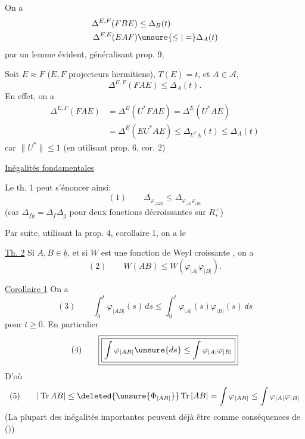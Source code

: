 

On a 
\[
\begin{aligned}
\Delta^{E,F}(FBE)&\leq\Delta_B(t)\\
\Delta^{F,E}(EAF)&\unsure{\leq|=}\Delta_A(t)
\end{aligned}
\]
par un lemme évident, généralisant prop. 9;

\margin{$\Big|$}
Soit $E\approx F$ ($E,F$ projecteurs hermitiens), $T(E)=t$, et $A\in\mathcal A$, 
\[
\Delta^{E,F}(FAE)\leq\Delta_A(t).
\]
En effet, on a
\[
\begin{aligned}
\Delta^{E,F}(FAE)&=\Delta^E(U^*FAE)=\Delta^E(U^*AE)\\
&=\Delta^E(EU^*AE)\leq\Delta_{U^*A}(t)\leq\Delta_A(t)
\end{aligned}
\]
car $\|U^*\|\leq1$ (en utilisant prop. 6, cor. 2)

\uline{Inégalités fondamentales}

Le th. 1 peut s'énoncer ainsi:
\[
(1)\qquad\Delta_{\varphi_{|AB|}}\leq\Delta_{\varphi_{|A|}\varphi_{|B|}}
\]
(car $\Delta_{fg}=\Delta_f\Delta_g$ pour deux fonctions décroissantes sur  $R_*^+$)

Par suite, utilisant la prop. 4, corollaire 1, on a le

\uline{Th. 2} Si $A,B\in\underline b$,  et si $W$ est une fonction de Weyl croissante  , on a
\margin{$\Big|$}
\[
(2)\qquad W(AB)\leq W(\varphi_{|A|}\varphi_{|B|}).
\]

\uline{Corollaire 1} On a 
\margin{$\Big|$}
\[
(3)\qquad\int_0^t\varphi_{|AB|}(s)\,ds
\leq\int_0^t\varphi_{|A|}(s)\varphi_{|B|}(s)\,ds
\]
pour  $t\geq0$. En particulier
\[
(4)\qquad\boxed{\boxed{\int\varphi_{|AB|}\unsure{ds}\leq\int\varphi_{|A|}\varphi_{|B|}}}
\]
D'où
\[
(5)\qquad |\operatorname{Tr}AB|\leq\deleted{\unsure{\Phi_{|AB|}}}\operatorname{Tr}|AB|
=\int\varphi_{|AB|}\leq\int\varphi_{|A|}\varphi_{|B|}
\]
(La plupart des inégalités importantes peuvent déjà être  comme conséquences de ())

